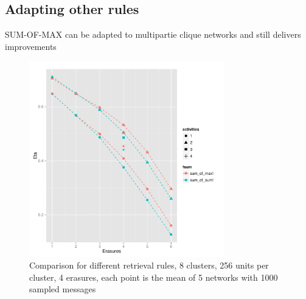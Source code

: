 \documentclass[english,10pt,twocolumn]{IEEEtran}
\theoremstyle{definition}
\begin{document}
	\subsection*{Adapting other rules}
	
	SUM-OF-MAX can be adapted to multipartie clique networks and still delivers improvements
	
	\begin{figure}[!htb]
		\includegraphics[width=8.5cm]{Courbes/comp_rulesmax}%
		\caption{Comparison for different retrieval rules, 8 clusters, 256 units per cluster, 4 erasures, each point is the mean of 5 networks with 1000 sampled messages}
		\label{fmaxth}
	\end{figure}
	
	
	
	
	\nocite{*}
     {}
\end{document}
